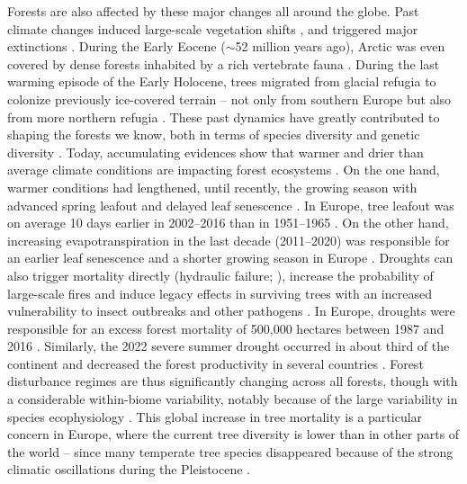 Forests are also affected by these major changes all around the globe. 
Past climate changes induced large-scale vegetation shifts \citep{Hoogakker2016, Nolan2018}, and triggered major extinctions \citep{Svenning2003}. During the Early Eocene ($\sim$52 million years ago), Arctic was even covered by dense forests inhabited by a rich vertebrate fauna \citep{Eberle2010}. During the last warming episode of the Early Holocene, trees migrated from glacial refugia to colonize previously ice-covered terrain \citep{Brewer2002, TerhuerneBerson2004,  Saltre2013} -- not only from southern Europe but also from more northern refugia \citep{Robin2016}. These past dynamics have greatly contributed to shaping the forests we know, both in terms of species diversity \citep{Svenning2007} and genetic diversity \citep{Cheddadi2006}. Today, accumulating evidences show that warmer and drier than average climate conditions are impacting forest ecosystems \citep{Allen2010, Senf2020}.  On the one hand, warmer conditions had lengthened, until recently, the growing season with advanced spring leafout and delayed leaf senescence \citep{Menzel1999}. In Europe, tree leafout was on average 10 days earlier in 2002–2016 than in 1951–1965 \citep{Fu2019}. On the other hand, increasing evapotranspiration in the last decade (2011–2020) was responsible for an earlier leaf senescence and a shorter growing season in Europe \citep{Rahmati2023}. Droughts can also trigger mortality directly (hydraulic failure; \citealp{Hartmann2018}), increase the probability of large-scale fires and induce legacy effects in surviving trees with an increased vulnerability to insect outbreaks and other pathogens \citep{Breshears2005, Seidl2017, Sommerfeld2018, Jactel2012, Mantgem2009, Hember2016}. In Europe, droughts were responsible for an excess forest mortality of 500,000 hectares between 1987 and 2016 \citep{Senf2020}. Similarly, the 2022 severe summer drought occurred in about third of the continent and decreased the forest productivity in several countries \citep{Woude2023}. Forest disturbance regimes are thus significantly changing across all forests, though with a considerable within-biome variability, notably because of the large variability in species ecophysiology \citep{Sommerfeld2018}. This global increase in tree mortality is a particular concern in Europe, 
where the current tree diversity is lower than in other parts of the world -- since many temperate tree species disappeared because of the strong climatic oscillations during the Pleistocene \citep{Svenning2003}.

